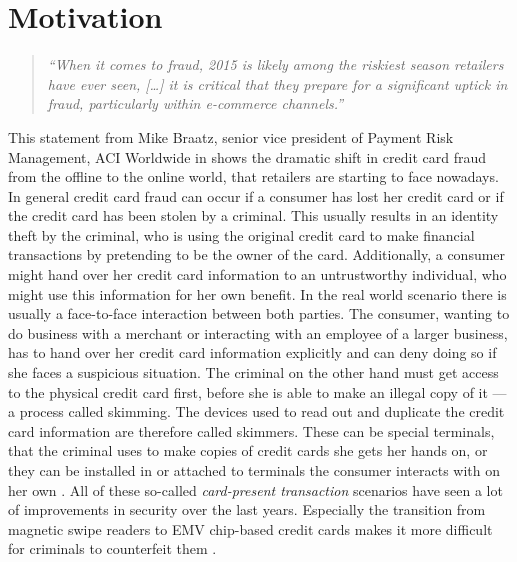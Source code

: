 
\section{Motivation}
\label{sec:motivation}

\begin{quotation}
    \textit{\enquote{When it comes to fraud, 2015 is likely among the riskiest season retailers have ever seen, […]
    it is critical that they prepare for a significant uptick in fraud, particularly within e-commerce channels.} \citep{Reuters2015}}
\end{quotation}
This statement from Mike Braatz, senior vice president of Payment Risk Management, ACI Worldwide in \citep{Reuters2015} shows the dramatic shift in credit card fraud from the offline to the online world, that retailers are starting to face nowadays. \\

In general credit card fraud can occur if a consumer has lost her credit card or if the credit card has been stolen by a criminal. This usually results in an identity theft by the criminal, who is using the original credit card to make financial transactions by pretending to be the owner of the card. Additionally, a consumer might hand over her credit card information to an untrustworthy individual, who might use this information for her own benefit. In the real world scenario there is usually a face-to-face interaction between both parties. The consumer, wanting to do business with a merchant or interacting with an employee of a larger business, has to hand over her credit card information explicitly and can deny doing so if she faces a suspicious situation. The criminal on the other hand must get access to the physical credit card first, before she is able to make an illegal copy of it --- a process called skimming. The devices used to read out and duplicate the credit card information are therefore called skimmers. These can be special terminals, that the criminal uses to make copies of credit cards she gets her hands on, or they can be installed in or attached to terminals the consumer interacts with on her own \citep{ConsumerAction2009}. All of these so-called \textit{card-present transaction} scenarios have seen a lot of improvements in security over the last years. Especially the transition from magnetic swipe readers to EMV chip-based credit cards makes it more difficult for criminals to counterfeit them \citep{Lewis2015}. \\


